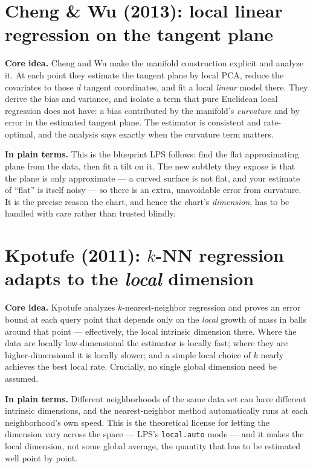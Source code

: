 \documentclass[11pt]{article}
\theoremstyle{definition}
\theoremstyle{remark}
\begin{document}
\section{Cheng \& Wu (2013): local linear regression on the tangent plane}
\label{app:chengwu}
\textbf{Core idea.} Cheng and Wu make the manifold construction explicit and
analyze it. At each point they estimate the tangent plane by local PCA, reduce the
covariates to those $d$ tangent coordinates, and fit a local \emph{linear} model
there. They derive the bias and variance, and isolate a term that pure Euclidean
local regression does not have: a bias contributed by the manifold's
\emph{curvature} and by error in the estimated tangent plane. The estimator is
consistent and rate-optimal, and the analysis says exactly when the curvature term
matters.

\textbf{In plain terms.} This is the blueprint LPS follows: find the flat
approximating plane from the data, then fit a tilt on it. The new subtlety they
expose is that the plane is only approximate --- a curved surface is not flat, and
your estimate of ``flat'' is itself noisy --- so there is an extra, unavoidable
error from curvature. It is the precise reason the chart, and hence the chart's
\emph{dimension}, has to be handled with care rather than trusted blindly.

\section{Kpotufe (2011): $k$-NN regression adapts to the \emph{local} dimension}
\label{app:kpotufe}
\textbf{Core idea.} Kpotufe analyzes $k$-nearest-neighbor regression and proves an
error bound at each query point that depends only on the \emph{local} growth of
mass in balls around that point --- effectively, the local intrinsic dimension
there. Where the data are locally low-dimensional the estimator is locally fast;
where they are higher-dimensional it is locally slower; and a simple local choice
of $k$ nearly achieves the best local rate. Crucially, no single global dimension
need be assumed.

\textbf{In plain terms.} Different neighborhoods of the same data set can have
different intrinsic dimensions, and the nearest-neighbor method automatically runs
at each neighborhood's own speed. This is the theoretical license for letting the
dimension vary across the space --- LPS's \texttt{local.auto} mode --- and it makes
the local dimension, not some global average, the quantity that has to be estimated
well point by point.
\end{document}
